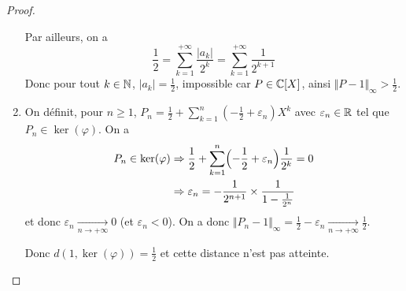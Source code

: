 \begin{proof}
\begin{enumerate}
		Par ailleurs, on a 
		\begin{equation}\frac{1}{2}=\sum_{k=1}^{+\infty}\frac{\vert a_{k}\vert}{2^{k}}=\sum_{k=1}^{+\infty}\frac{1}{2^{k+1}}\end{equation}
		Donc pour tout $k\in\mathbb{N}$, $\vert a_{k}\vert=\frac{1}{2}$, impossible car $P\in\mathbb{C}[X]$, ainsi $\Vert P-1\Vert_{\infty}>\frac{1}{2}$.

		\item On définit, pour $n\geqslant1$, $P_{n}=\frac{1}{2}+\sum_{k=1}^{n}(-\frac{1}{2}+\varepsilon_{n})X^{k}$ avec $\varepsilon_{n}\in\mathbb{R}$ tel que $P_{n}\in\ker(\varphi)$. On a 
		\begin{align}
			P_{n}\in\ker(\varphi)
			&\Rightarrow\frac{1}{2}+\sum_{k=1}^{n}\Bigl(-\frac{1}{2}+\varepsilon_{n}\Bigr)\frac{1}{2^{k}}=0\\
			&\Rightarrow\varepsilon_{n}=-\frac{1}{2^{n+1}}\times \frac{1}{1-\frac{1}{2^{n}}}
		\end{align}
		et donc $\varepsilon_{n}\xrightarrow[n\to+\infty]{}0$ (et $\varepsilon_{n}<0$). On a donc $\Vert P_{n}-1\Vert_{\infty}=\frac{1}{2}-\varepsilon_{n}\xrightarrow[n\to+\infty]{}\frac{1}{2}$.

		Donc $d(1,\ker(\varphi))=\frac{1}{2}$ et cette distance n'est pas atteinte.
	\end{enumerate}
\end{proof}

